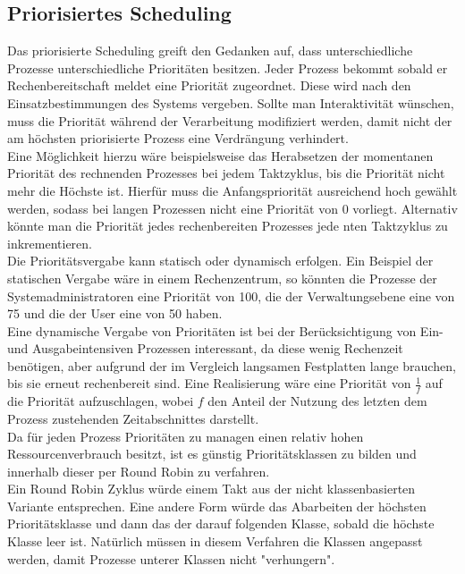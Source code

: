 \subsection{Priorisiertes Scheduling}
Das priorisierte Scheduling greift den Gedanken auf, dass unterschiedliche Prozesse unterschiedliche Prioritäten besitzen. Jeder Prozess bekommt sobald er Rechenbereitschaft meldet eine Priorität zugeordnet.
Diese wird nach den Einsatzbestimmungen des Systems vergeben. Sollte man Interaktivität wünschen, muss die Priorität während der Verarbeitung modifiziert werden, damit nicht der am höchsten priorisierte Prozess eine Verdrängung verhindert. \\
Eine Möglichkeit hierzu wäre beispielsweise das Herabsetzen der momentanen Priorität des rechnenden Prozesses bei jedem Taktzyklus, bis die Priorität nicht mehr die Höchste ist. Hierfür muss die Anfangspriorität ausreichend hoch gewählt werden, sodass bei langen Prozessen nicht eine Priorität von 0 vorliegt. Alternativ könnte man die Priorität jedes rechenbereiten Prozesses jede nten Taktzyklus zu inkrementieren. \\
Die Prioritätsvergabe kann statisch oder dynamisch erfolgen. Ein Beispiel der statischen Vergabe wäre in einem Rechenzentrum, so könnten die Prozesse der Systemadministratoren eine Priorität von 100, die der Verwaltungsebene eine von 75 und die der User eine von 50 haben. \\
Eine dynamische Vergabe von Prioritäten ist bei der Berücksichtigung von Ein- und Ausgabeintensiven Prozessen interessant, da diese wenig Rechenzeit benötigen, aber aufgrund der im Vergleich langsamen Festplatten lange brauchen, bis sie erneut rechenbereit sind. Eine Realisierung wäre eine Priorität von \(\frac{1}{f}\) auf die Priorität aufzuschlagen, wobei \(f\) den Anteil der Nutzung des letzten dem Prozess zustehenden Zeitabschnittes darstellt. \\
Da für jeden Prozess Prioritäten zu managen einen relativ hohen Ressourcenverbrauch besitzt, ist es günstig Prioritätsklassen zu bilden und innerhalb dieser per Round Robin zu verfahren. \cite{OSThreePieces2014} \\
Ein Round Robin Zyklus würde einem Takt aus der nicht klassenbasierten Variante entsprechen. Eine andere Form würde das Abarbeiten der höchsten Prioritätsklasse und dann das der darauf folgenden Klasse, sobald die höchste Klasse leer ist. Natürlich müssen in diesem Verfahren die Klassen angepasst werden, damit Prozesse unterer Klassen nicht "verhungern". \cite{tanenb2009}

